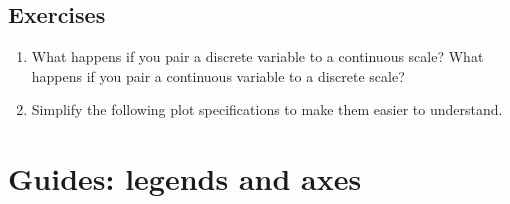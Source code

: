 \hypertarget{exercises}{%
\subsection{Exercises}\label{exercises}}

\begin{enumerate}
\def\labelenumi{\arabic{enumi}.}
\item
  What happens if you pair a discrete variable to a continuous scale?
  What happens if you pair a continuous variable to a discrete scale?
\item
  Simplify the following plot specifications to make them easier to
  understand.

\begin{Shaded}
\begin{Highlighting}[]
\OperatorTok{+}\StringTok{ }
\StringTok{  }\NormalTok{(}\NormalTok{) }\OperatorTok{+}\StringTok{ }
\StringTok{  }\NormalTok{() }\OperatorTok{+}
\StringTok{  }\NormalTok{(}\NormalTok{(}

\NormalTok{(}\OperatorTok{+}\StringTok{ }
\StringTok{  }\NormalTok{(}\NormalTok{) }\OperatorTok{+}\StringTok{ }
\StringTok{  }\NormalTok{(}\NormalTok{) }\OperatorTok{+}
\StringTok{  }\NormalTok{(}\NormalTok{) }\OperatorTok{+}\StringTok{ }
\StringTok{  }\NormalTok{() }\OperatorTok{+}\StringTok{ }
\StringTok{  }\NormalTok{(}\NormalTok{(}\OperatorTok{+}\StringTok{ }
\StringTok{  }\NormalTok{(}\NormalTok{)}
\end{Highlighting}
\end{Shaded}
\end{enumerate}

\hypertarget{sec:guides}{%
\section{Guides: legends and axes}\label{sec:guides}}

